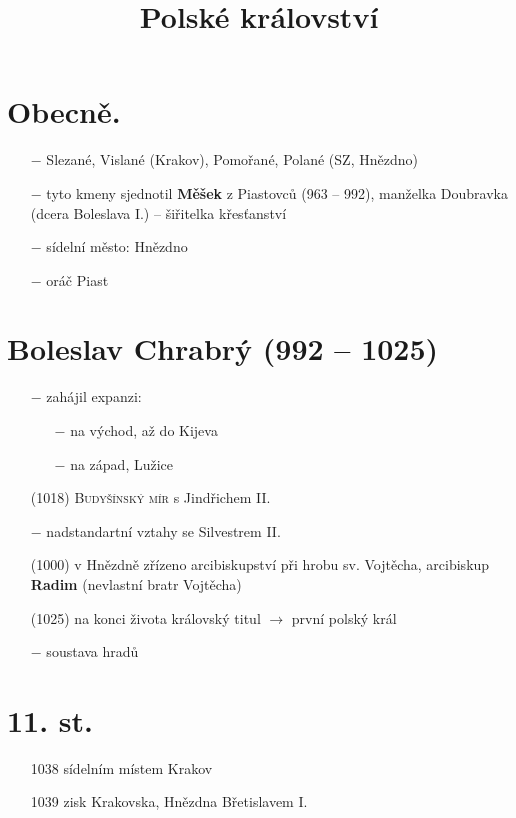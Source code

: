 \documentclass{article}
\title{\vspace{-2cm}Polské království\vspace{-1.7cm}}
\date{}
\author{}
\begin{document}
\maketitle
\section*{Obecně.}
\begin{itemize}
    \vspace{-0.5em}
    \setlength\itemsep{0.15em}
    \item[$-$] Slezané, Vislané (Krakov), Pomořané, Polané (SZ, Hnězdno)
    \item[$-$] tyto kmeny sjednotil \textbf{Měšek} z Piastovců (963 -- 992), manželka Doubravka (dcera Boleslava I.) -- šiřitelka křesťanství
    \item[$-$] sídelní město: Hnězdno
    \item[$-$] oráč Piast
\end{itemize}

\section*{Boleslav Chrabrý (992 -- 1025)}
\begin{itemize}
    \vspace{-0.5em}
    \setlength\itemsep{0.15em}
    \item[$-$] zahájil expanzi:
    \begin{itemize}
        \vspace{-0.5em}
        \setlength\itemsep{0.15em}
        \item[$-$] na východ, až do Kijeva
        \item[$-$] na západ, Lužice
    \end{itemize}
    \item[(1018)] \textsc{Budyšínský mír} s Jindřichem II.
    \item[$-$] nadstandartní vztahy se Silvestrem II.
    \item[(1000)] v Hnězdně zřízeno arcibiskupství při hrobu sv. Vojtěcha, arcibiskup \textbf{Radim} (nevlastní bratr Vojtěcha)
    \item[(1025)] na konci života královský titul $\rightarrow$ první polský král
    \item[$-$] soustava hradů
\end{itemize}

\section*{11. st.}
\begin{itemize}
    \vspace{-0.5em}
    \setlength\itemsep{0.15em}
    \item[1038] sídelním místem Krakov
    \item[1039] zisk Krakovska, Hnězdna Břetislavem I.
\end{itemize}
\end{document}
